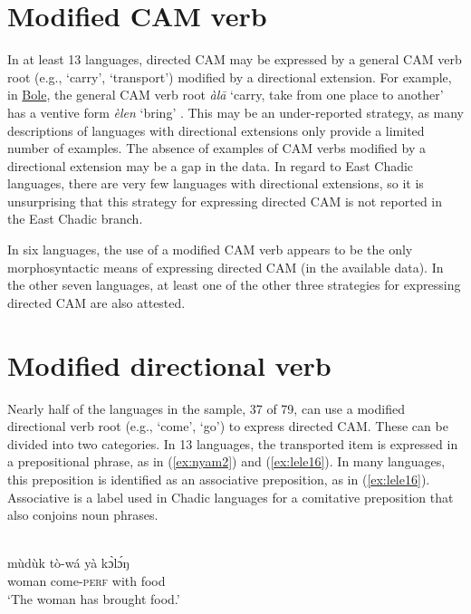 \section{Modified CAM verb} \label{sec:modcamverb}

In at least 13 languages, directed CAM may be expressed by a general CAM verb root (e.g., `carry', `transport') modified by a directional extension. For example, in \hyperref[bole]{Bole}, the general CAM verb root \textit{àlā} `carry, take from one place to another' has a ventive form \textit{èlen} `bring' \citep{gimbaBoleenglishhausaDictionaryAlhaji2004}. This may be an under-reported strategy, as many descriptions of languages with directional extensions only provide a limited number of examples. The absence of examples of CAM verbs modified by a directional extension may be a gap in the data. In regard to East Chadic languages, there are very few languages with directional extensions, so it is unsurprising that this strategy for expressing directed CAM is not reported in the East Chadic branch. 

In six languages, the use of a modified CAM verb appears to be the only morphosyntactic means of expressing directed CAM (in the available data). In the other seven languages, at least one of the other three strategies for expressing directed CAM are also attested. 

\section{Modified directional verb} \label{sec:dirCAM}

Nearly half of the languages in the sample, 37 of 79, can use a modified directional verb root (e.g., `come', `go') to express directed CAM. These can be divided into two categories. In 13 languages, the transported item is expressed in a prepositional phrase, as in (\ref{ex:nyam2}) and (\ref{ex:lele16}). In many languages, this preposition is identified as an associative preposition, as in (\ref{ex:lele16}). Associative is a label used in Chadic languages for a comitative preposition that also conjoins noun phrases. 

\ea\label{ex:nyam2}
 \\
\gll mùdùk tò-wá yà kɔ̀lɔ́ŋ \\
woman come-\textsc{perf} with food \\
\glt `The woman has brought food.'

